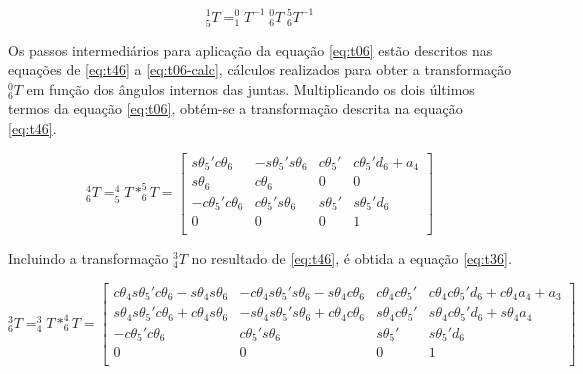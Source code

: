 \begin{equation}
    \label{eq:t15}
    ^1_5T = ^0_1\!T^{-1}\;^0_6T\;^5_6T^{-1}
\end{equation}

Os passos intermediários para aplicação da equação \ref{eq:t06} estão descritos nas equações de \ref{eq:t46} a
\ref{eq:t06-calc}, cálculos realizados para obter a transformação $^0_6T$ em função dos ângulos internos das juntas.
Multiplicando os dois últimos termos da equação \ref{eq:t06}, obtém-se a transformação descrita na
equação \ref{eq:t46}.

\begin{equation}
    \label{eq:t46}
    ^4_6T = ^4_5T*^5_6T =   \begin{bmatrix}
                                s\theta_5'c\theta_6 & -s\theta_5's\theta_6 & c\theta_5' & c\theta_5'd_6 + a_4 \\
                                s\theta_6 & c\theta_6 & 0 & 0 \\
                                -c\theta_5'c\theta_6 & c\theta_5's\theta_6 & s\theta_5' & s\theta_5'd_6 \\
                                0 & 0 & 0 & 1 \\
                            \end{bmatrix}
\end{equation}

Incluindo a transformação $^3_4T$ no resultado de \ref{eq:t46}, é obtida a equação \ref{eq:t36}.

\begin{equation}
    \label{eq:t36}
    ^3_6T = ^3_4T*^4_6T =   \begin{bmatrix}
                                c\theta_4s\theta_5'c\theta_6 - s\theta_4s\theta_6 & -c\theta_4s\theta_5's\theta_6 - s\theta_4c\theta_6 & c\theta_4c\theta_5' & c\theta_4c\theta_5'd_6 + c\theta_4a_4 + a_3 \\
                                s\theta_4s\theta_5'c\theta_6 + c\theta_4s\theta_6 & -s\theta_4s\theta_5's\theta_6 + c\theta_4c\theta_6 & s\theta_4c\theta_5' & s\theta_4c\theta_5'd_6 + s\theta_4a_4 \\
                                -c\theta_5'c\theta_6 & c\theta_5's\theta_6 & s\theta_5' & s\theta_5'd_6 \\
                                0 & 0 & 0 & 1 \\
                            \end{bmatrix}
\end{equation}

